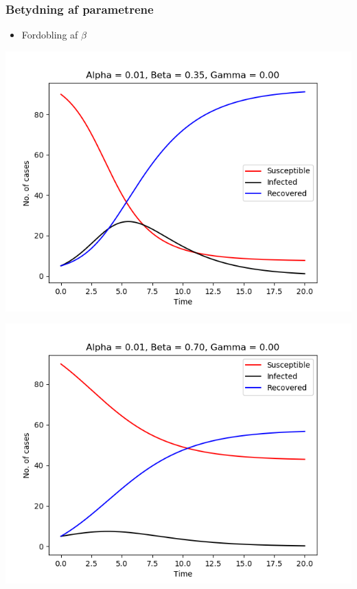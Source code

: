 \begin{frame}
\frametitle{Betydning af parametrene}
\begin{itemize}
\item Fordobling af $\beta$
\end{itemize}

\begin{minipage}{0.49\textwidth}
\includegraphics[scale=0.3]{fig/img/t_a1_b35_g0.png}
\end{minipage}
%
\begin{minipage}{0.49\textwidth}
\includegraphics[scale=0.3]{fig/img/t_a1_b7_g0.png}
\end{minipage}
\end{frame}
%
